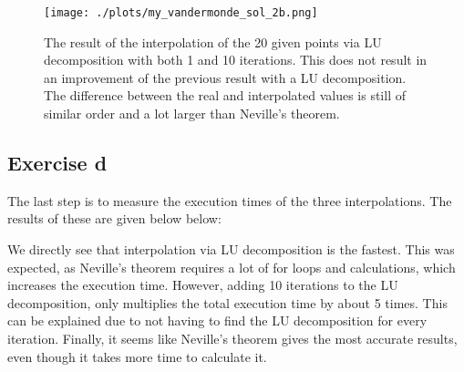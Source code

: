 \begin{figure}[h!]
  \centering
  \texttt{[image: ./plots/my\_vandermonde\_sol\_2b.png]}
  \caption{The result of the interpolation of the 20 given points via LU decomposition with both 1 and 10 iterations. This does not result in an improvement of the previous result with a LU decomposition. The difference between the real and interpolated values is still of similar order and a lot larger than Neville's theorem.}
  \label{fig:2c}
\end{figure}

\subsection{Exercise d}

The last step is to measure the execution times of the three interpolations. The results of these are given below below: 

We directly see that interpolation via LU decomposition is the fastest. This was expected, as Neville's theorem requires a lot of for loops and calculations, which increases the execution time. However, adding 10 iterations to the LU decomposition, only multiplies the total execution time by about 5 times. This can be explained due to not having to find the LU decomposition for every iteration. Finally, it seems like Neville's theorem gives the most accurate results, even though it takes more time to calculate it. 

